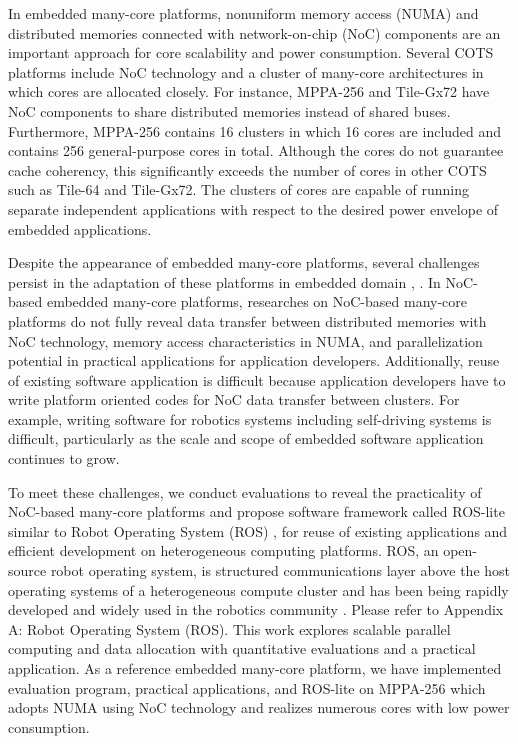 In embedded many-core platforms, nonuniform memory access (NUMA) and distributed memories connected with network-on-chip (NoC) components are an important approach for core scalability and power consumption.
Several COTS platforms include NoC technology and a cluster of many-core architectures in which cores are  allocated closely.
For instance, MPPA-256 and Tile-Gx72 have NoC components to share distributed memories instead of shared buses.
Furthermore, MPPA-256 contains 16 clusters in which 16 cores are included and contains 256 general-purpose cores in total.
Although the cores do not guarantee cache coherency, this significantly exceeds the number of cores in other COTS such as Tile-64 and Tile-Gx72.
The clusters of cores are capable of running separate independent applications with respect to the desired power envelope of embedded applications.

Despite the appearance of embedded many-core platforms, several challenges persist in the adaptation of these platforms in embedded domain \cite{becker2016contention}, \cite{saidi2015shift}.
In NoC-based embedded many-core platforms, researches on NoC-based many-core platforms do not fully reveal data transfer between distributed memories with NoC technology, memory access characteristics in NUMA, and parallelization potential in practical applications for application developers.
Additionally, reuse of existing software application is difficult because application developers have to write platform oriented codes for NoC data transfer between clusters.
For example, writing software for robotics systems including self-driving systems is difficult, particularly as the scale and scope of embedded software application continues to grow.

To meet these challenges, we conduct evaluations to reveal the practicality of NoC-based many-core platforms and propose software framework called ROS-lite similar to Robot Operating System (ROS) \cite{quigley2009ros}, \cite{rosorg} for reuse of existing applications and efficient development on heterogeneous computing platforms.
ROS, an open-source robot operating system, is structured communications layer above the host operating systems of a heterogeneous compute cluster and has been being rapidly developed and widely used in the robotics community \cite{cousins2011exponential}.
Please refer to Appendix A: Robot Operating System (ROS).
This work explores scalable parallel computing and data allocation with quantitative evaluations and a practical application.
As a reference embedded many-core platform, we have implemented evaluation program, practical applications, and ROS-lite on MPPA-256 \cite{de2014time} which adopts NUMA using NoC technology and realizes numerous cores with low power consumption.

